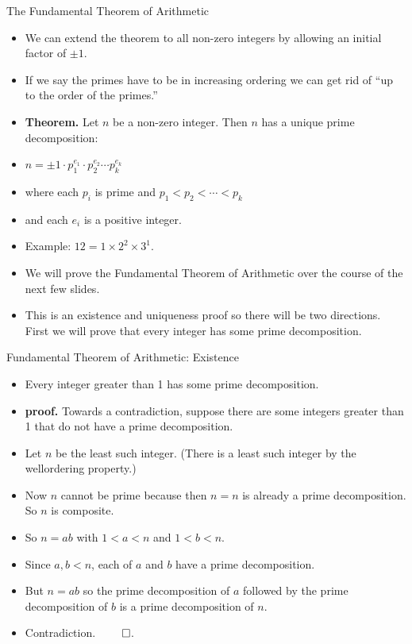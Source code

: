 \documentclass{beamer}
\begin{document}
\begin{frame}{The Fundamental Theorem of Arithmetic}

\begin{itemize}
  \item We can extend the theorem to all non-zero integers by allowing an initial factor of $\pm 1$.
  \item If we say the primes have to be in increasing ordering we can get rid of ``up to the order of the primes.''
  \item \textbf{Theorem.} Let $n$ be a non-zero integer. Then $n$ has a unique prime decomposition:
  \item $n=\pm1 \cdot p_1^{e_1} \cdot p_2^{e_2} \cdots p_k^{e_k}$
  \item where each $p_i$ is prime and $p_1<p_2<\cdots < p_k$
  \item and each $e_i$ is a positive integer.
  \item Example: $12 = 1 \times 2^2 \times 3^1$.
  \item We will prove the Fundamental Theorem of Arithmetic over the course of the next few slides.
  \item This is an existence and uniqueness proof so there will be two directions. First we
  will prove that every integer has some prime decomposition.
\end{itemize}

\end{frame}

\begin{frame}{Fundamental Theorem of Arithmetic: Existence}

\begin{itemize}
  \item Every integer greater than 1 has some prime decomposition.
  \item \textbf{proof.} Towards a contradiction, suppose there are some integers greater than 1 that do not have a prime decomposition.
  \item Let $n$ be the least such integer. (There is a least such integer by the wellordering property.)
  \item Now $n$ cannot be prime because then $n=n$ is already a prime decomposition. So $n$ is composite.
  \item So $n = ab$ with $1<a<n$ and $1<b<n$.
  \item Since $a,b < n$, each of $a$ and $b$ have a prime decomposition.
  \item But $n=ab$ so the prime decomposition of $a$ followed by the prime decomposition of $b$ is a prime decomposition of $n$.
  \item Contradiction. $\qed$.
\end{itemize}

\end{frame}
\end{document}
